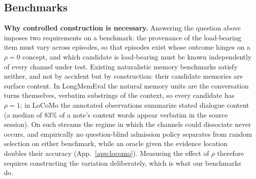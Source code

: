 \subsection{Benchmarks}
\label{sec:benchmarks}

\textbf{Why controlled construction is necessary.}
Answering the question above imposes two requirements on a benchmark: the
provenance of the load-bearing item must vary across episodes, so that
episodes exist whose outcome hinges on a $\rho{=}0$ concept, and which
candidate is load-bearing must be known independently of every channel under
test. Existing naturalistic memory benchmarks satisfy neither, and not by
accident but by construction: their candidate memories are surface content.
In LongMemEval \citep{wu2025longmemeval} the natural memory units are the
conversation turns themselves, verbatim substrings of the context, so every
candidate has $\rho{=}1$; in LoCoMo \citep{maharana2024locomo} the annotated
observations summarize stated dialogue content (a median of $83\%$ of a
note's content words appear verbatim in the source session). On such streams
the regime in which the channels could dissociate never occurs, and
empirically no question-blind admission policy separates from random
selection on either benchmark, while an oracle given the evidence location
doubles their accuracy (App.~\ref{app:locomo}). Measuring the effect of
$\rho$ therefore requires constructing the variation deliberately, which is
what our benchmarks do.

